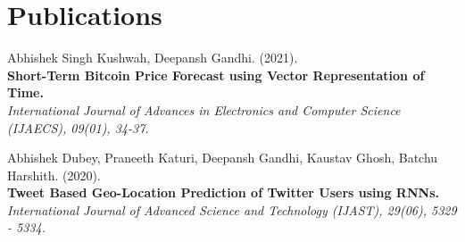 \documentclass[letterpaper]{resume_config}
\begin{document}
\vspace{-7pt}


\section{Publications}
\vspace{-1pt}


Abhishek Singh Kushwah, Deepansh Gandhi. (2021). \\
{\textbf{Short-Term Bitcoin Price Forecast using Vector Representation of Time.}} 
\\\textit{International Journal of Advances in Electronics and Computer Science (IJAECS), 09(01), 34-37.}

\vspace{2pt}

Abhishek Dubey, Praneeth Katuri, Deepansh Gandhi, Kaustav Ghosh, Batchu Harshith. (2020). \\
{\textbf{Tweet Based Geo-Location Prediction of Twitter Users using RNNs.}} 
\\\textit{International Journal of Advanced Science and Technology (IJAST), 29(06), 5329 - 5334.}
\vspace{-6pt}




\vspace{-10pt}
\end{document}
